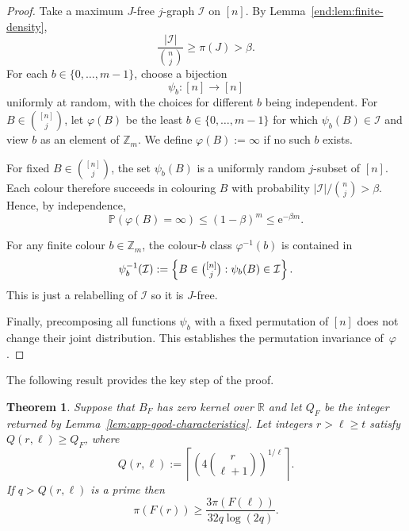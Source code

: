 \documentclass[12pt,a4paper]{article}
\numberwithin{equation}{section}
\newtheorem{theorem}{Theorem}[section]
\theoremstyle{definition}
\theoremstyle{remark}
\newcommand{\Z}[1]{\mathbb Z_{#1}}
\newcommand{\me}{\mathrm{e}}
\newcommand{\PP}{m}
\renewcommand{\longrightarrow}{\to}
\begin{document}
\begin{proof}
Take a maximum $J$-free $j$-graph $\mathcal I$ on $[n]$.  By Lemma~\ref{end:lem:finite-density},
\[
 \frac{|\mathcal I|}{\binom nj}\ge\pi(J)>\beta.
\]
For each $b\in\{0,\ldots,\PP-1\}$, choose a bijection
\[
 \psi_b:[n]\longrightarrow[n]
\]
 uniformly at random, with the choices for different $b$ being independent.
For $B\in\binom{[n]}j$, let $\varphi(B)$ be the least $b\in\{0,\ldots,\PP-1\}$ for which $\psi_b(B)\in\mathcal I$ and view $b$ as an element of $\Z{\PP}$. We define $\varphi(B):=\infty$ if no such $b$ exists.

For fixed $B\in\binom{[n]}{j}$, the set $\psi_b(B)$ is a uniformly random $j$-subset of $[n]$.  Each colour therefore succeeds in colouring $B$ with probability $|\mathcal I|/\binom nj>\beta$.  Hence, by independence,
\[
 \mathbb P(\varphi(B)=\infty)
 \le(1-\beta)^\PP\le \me^{-\beta \PP}.
\]

For any finite colour $b\in\Z{\PP}$, the colour-$b$ class $\varphi^{-1}(b)$ is contained in
\[
 \psi_b^{-1}(\mathcal I)
 :=\left\{B\in\tbinom{[n]}j:\psi_b(B)\in\mathcal I\right\}.
\]
 This is just a relabelling of $\mathcal I$ so it is $J$-free.

Finally, precomposing all functions $\psi_b$ with a fixed permutation of $[n]$ does not change their joint distribution.  This establishes the permutation invariance of~$\varphi$.
\end{proof}


The following result provides the key step of the proof.

\begin{theorem}\label{thm:app-lifting}
Suppose that $B_F$ has zero kernel over $\mathbb R$ and let $Q_F$ be the integer returned by Lemma~\ref{lem:app-good-characteristics}. 
Let integers $r>\ell\ge t$ satisfy $Q(r,\ell)\ge Q_F$, where 
\begin{equation}\label{eq:app-Q}
	Q(r,\ell):=
	\left\lceil
	\left(4\binom{r}{\ell+1}\right)^{1/\ell}
	\right\rceil.
\end{equation}
If $q>Q(r,\ell)$ is a prime then
\begin{equation}\label{eq:app-lifting}
 \pi(F(r))
 \ge
 \frac{3\pi(F(\ell))}{32q\log(2q)}.
\end{equation}
\end{theorem}
\end{document}
